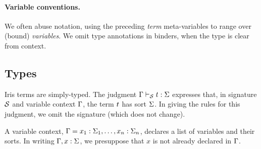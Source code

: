 \paragraph{Variable conventions.}
We often abuse notation, using the preceding \emph{term} meta-variables to range over (bound) \emph{variables}.
We omit type annotations in binders, when the type is clear from context.


\subsection{Types}\label{sec:types}

Iris terms are simply-typed.
The judgment $\Gamma \vdash_{\mathcal{S}} t : \Sigma$ expresses that, in signature $\mathcal{S}$ and variable context $\Gamma$, the term $t$ has sort $\Sigma$.
In giving the rules for this judgment, we omit the signature (which does not change).

A variable context, $\Gamma = x_1:\Sigma_1, \dots, x_n:\Sigma_n$, declares a list of variables and their sorts.
In writing $\Gamma, x:\Sigma$, we presuppose that $x$ is not already declared in $\Gamma$.

